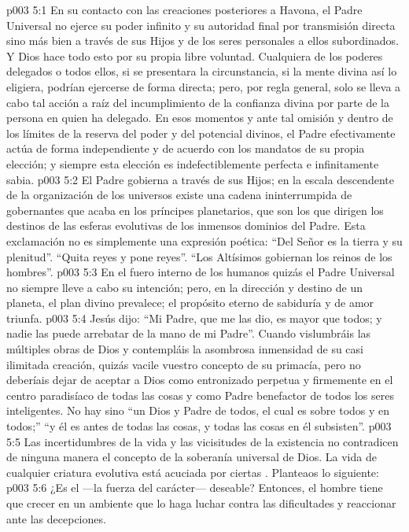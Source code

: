 \vs p003 5:1 En su contacto con las creaciones posteriores a Havona, el Padre Universal no ejerce su poder infinito y su autoridad final por transmisión directa sino más bien a través de sus Hijos y de los seres personales a ellos subordinados. Y Dios hace todo esto por su propia libre voluntad. Cualquiera de los poderes delegados o todos ellos, si se presentara la circunstancia, si la mente divina así lo eligiera, podrían ejercerse de forma directa; pero, por regla general, solo se lleva a cabo tal acción a raíz del incumplimiento de la confianza divina por parte de la persona en quien ha delegado. En esos momentos y ante tal omisión y dentro de los límites de la reserva del poder y del potencial divinos, el Padre efectivamente actúa de forma independiente y de acuerdo con los mandatos de su propia elección; y siempre esta elección es indefectiblemente perfecta e infinitamente sabia.
\vs p003 5:2 El Padre gobierna a través de sus Hijos; en la escala descendente de la organización de los universos existe una cadena ininterrumpida de gobernantes que acaba en los príncipes planetarios, que son los que dirigen los destinos de las esferas evolutivas de los inmensos dominios del Padre. Esta exclamación no es simplemente una expresión poética: “Del Señor es la tierra y su plenitud”. “Quita reyes y pone reyes”. “Los Altísimos gobiernan los reinos de los hombres”.
\vs p003 5:3 En el fuero interno de los humanos quizás el Padre Universal no siempre lleve a cabo su intención; pero, en la dirección y destino de un planeta, el plan divino prevalece; el propósito eterno de sabiduría y de amor triunfa.
\vs p003 5:4 Jesús dijo: “Mi Padre, que me las dio, es mayor que todos; y nadie las puede arrebatar de la mano de mi Padre”. Cuando vislumbráis las múltiples obras de Dios y contempláis la asombrosa inmensidad de su casi ilimitada creación, quizás vacile vuestro concepto de su primacía, pero no deberíais dejar de aceptar a Dios como entronizado perpetua y firmemente en el centro paradisíaco de todas las cosas y como Padre benefactor de todos los seres inteligentes. No hay sino “un Dios y Padre de todos, el cual es sobre todos y en todos;” “y él es antes de todas las cosas, y todas las cosas en él subsisten”.
\vs p003 5:5 \pc Las incertidumbres de la vida y las vicisitudes de la existencia no contradicen de ninguna manera el concepto de la soberanía universal de Dios. La vida de cualquier criatura evolutiva está acuciada por ciertas . Planteaos lo siguiente:
\vs p003 5:6 ¿Es el  ---la fuerza del carácter--- deseable? Entonces, el hombre tiene que crecer en un ambiente que lo haga luchar contra las dificultades y reaccionar ante las decepciones.
